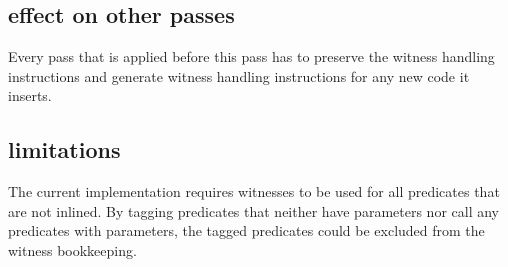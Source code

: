 \subsection{effect on other passes}

Every pass that is applied before this pass has to preserve the
witness handling instructions and generate witness handling instructions
for any new code it inserts.


\subsection{limitations}

The current implementation requires witnesses to be used for all predicates that
are not inlined. By tagging predicates that neither have parameters nor call
any predicates with parameters, the tagged predicates could be excluded
from the witness bookkeeping.

